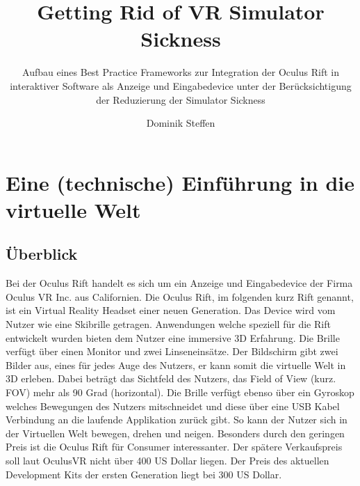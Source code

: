 \documentclass[pagesize, paper=a4, fontsize=12pt,titlepage=true, headings=small, headnosepline, abstractoff, liststotoc, nochapterprefix, plainheadsepline]{scrreprt}
\author{
Dominik Steffen
}
\title{Getting Rid of VR Simulator Sickness}
\subtitle{Aufbau eines Best Practice Frameworks zur Integration der Oculus Rift in interaktiver Software als Anzeige und Eingabedevice unter der Berücksichtigung der Reduzierung der Simulator Sickness}
\begin{document}
\maketitle
%

\thispagestyle{empty}
\mbox{}

\begingroup
	\clearpage
	\pagestyle{empty}
	\thispagestyle{empty}
	\tableofcontents
	\clearpage
\endgroup
\thispagestyle{empty}
\mbox{}


\renewcommand*{\chapterpagestyle}{plain}
\pagestyle{plain}
\setcounter{page}{0}

\chapter{Eine (technische) Einführung in die virtuelle Welt}

\section{Überblick}
Bei der Oculus Rift handelt es sich um ein Anzeige und Eingabedevice der Firma Oculus VR Inc. aus Californien. Die Oculus Rift, im folgenden kurz Rift genannt, ist ein Virtual Reality Headset einer neuen Generation. Das Device wird vom Nutzer wie eine Skibrille getragen. Anwendungen welche speziell für die Rift entwickelt wurden bieten dem Nutzer eine immersive 3D Erfahrung. Die Brille verfügt über einen Monitor und zwei Linseneinsätze. Der Bildschirm gibt zwei Bilder aus, eines für jedes Auge des Nutzers, er kann somit die virtuelle Welt in 3D erleben. Dabei beträgt das Sichtfeld des Nutzers, das Field of View (kurz. FOV) mehr als 90 Grad (horizontal). Die Brille verfügt ebenso über ein Gyroskop welches Bewegungen des Nutzers mitschneidet und diese über eine USB Kabel Verbindung an die laufende Applikation zurück gibt. So kann der Nutzer sich in der Virtuellen Welt bewegen, drehen und neigen. Besonders durch den geringen Preis ist die Oculus Rift für Consumer interessanter. Der spätere Verkaufspreis soll laut OculusVR nicht über 400 US Dollar liegen. Der Preis des aktuellen Development Kits der ersten Generation liegt bei 300 US Dollar.
\end{document}
